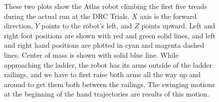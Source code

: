 \documentclass{ws-ijhr}
\begin{document}
\begin{figure}
  \begin{center}
    \caption{
      These two plots show the Atlas robot climbing the first five treads during
      the actual run at the DRC Trials. 
      $X$ axis is the forward direction, $Y$ points to the robot's left, and
      $Z$ points upward. 
      Left and right foot positions are shown with red
      and green solid lines, and left and right hand positions are plotted in
      cyan and magenta dashed lines. Center of mass is shown with solid blue 
      line. While approaching the ladder, the robot has its arms outside of
      the ladder railings, and we have to first raise both arms all the way up 
      and around to get them both between the railings. The swinging motions at
      the beginning of the hand trajectories are results of this motion. 
      }\label{fig:ladder_data} 
  \end{center}
\end{figure}
\end{document}
